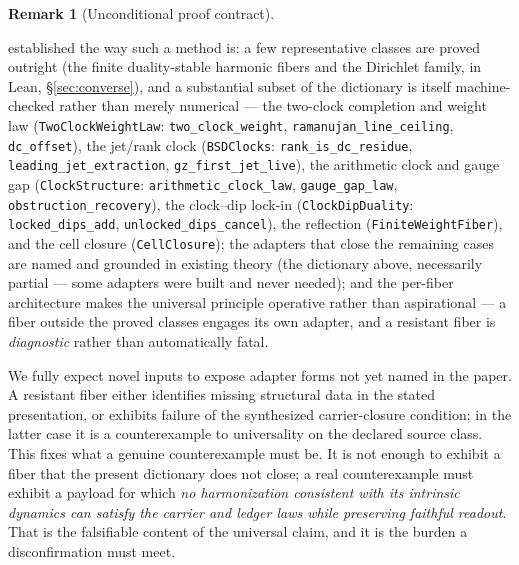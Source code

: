 \documentclass[11pt]{article}
\theoremstyle{definition}
\newtheorem{remark}[theorem]{Remark}
\begin{document}
\begin{remark}[Unconditional proof contract]
\begin{enumerate}
established the way such a method is: a few representative classes are proved outright (the finite
duality-stable harmonic fibers and the Dirichlet family, in Lean, \S\ref{sec:converse}), and a substantial
subset of the dictionary is itself machine-checked rather than merely numerical --- the two-clock
completion and weight law (\texttt{TwoClockWeightLaw}: \texttt{two\_clock\_weight},
\texttt{ramanujan\_line\_ceiling}, \texttt{dc\_offset}), the jet/rank clock (\texttt{BSDClocks}:
\texttt{rank\_is\_dc\_residue}, \texttt{leading\_jet\_extraction}, \texttt{gz\_first\_jet\_live}), the
arithmetic clock and gauge gap (\texttt{ClockStructure}: \texttt{arithmetic\_clock\_law},
\texttt{gauge\_gap\_law}, \texttt{obstruction\_recovery}), the clock--dip lock-in (\texttt{ClockDipDuality}:
\texttt{locked\_dips\_add}, \texttt{unlocked\_dips\_cancel}), the reflection (\texttt{FiniteWeightFiber}),
and the cell closure (\texttt{CellClosure}); the adapters that close the remaining cases are named and
grounded in existing theory (the dictionary above, necessarily partial --- some adapters were built and
never needed); and the per-fiber architecture makes the universal principle
operative rather than aspirational --- a fiber outside the proved classes engages its own adapter, and a resistant fiber is
\emph{diagnostic} rather than automatically fatal.

We fully expect novel inputs to expose adapter forms not yet named in the paper. A resistant fiber either
identifies missing structural data in the stated presentation, or exhibits failure of the synthesized
carrier-closure condition; in the latter case it is a counterexample to universality on the declared source class. This fixes what
a genuine counterexample must be. It is not enough to exhibit a fiber that the present dictionary does not
close; a real counterexample must exhibit a payload for which \emph{no harmonization consistent with its
intrinsic dynamics can satisfy the carrier and ledger laws while preserving faithful readout}. That is the
falsifiable content of the universal claim, and it is the burden a disconfirmation must meet.


\end{enumerate}
\end{remark}
\end{document}
